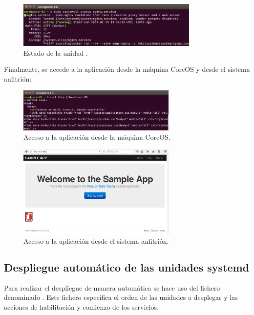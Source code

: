 \begin{figure}[H]
\centering
\includegraphics[width=0.8\textwidth]{images/figures/nginx.service.png}
\caption{Estado de la unidad .}
\end{figure}

Finalmente, se accede a la aplicación desde la máquina CoreOS y desde el sistema anfitrión:

\begin{figure}[H]
\centering
\includegraphics[width=0.7\textwidth]{images/figures/coreosmanualcurl.png}
\caption{Acceso a la aplicación desde la máquina CoreOS.}
\end{figure}

\begin{figure}[H]
\centering
\includegraphics[width=0.7\textwidth]{images/figures/coreosmanualhost.png}
\caption{Acceso a la aplicación desde el sistema anfitrión.}
\end{figure}

\subsection{Despliegue automático de las unidades systemd}

Para realizar el despliegue de manera automática se hace uso del fichero  denominado . Este fichero especifica el orden de las unidades a desplegar y las acciones de habilitación y comienzo de los servicios.

